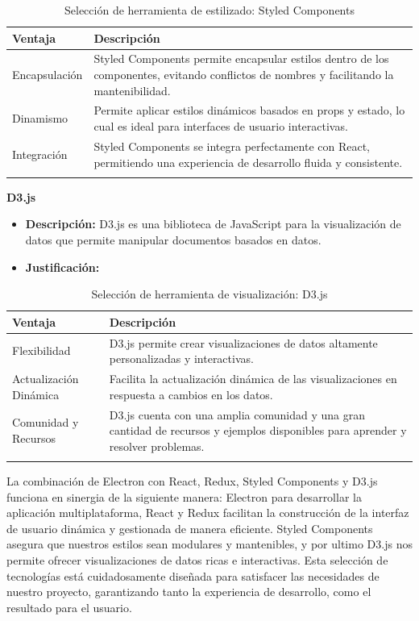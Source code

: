 \begin{longtable}{|p{3cm}|p{10cm}|}
\hline
\textbf{Ventaja} & \textbf{Descripción} \\ \hline
Encapsulación & Styled Components permite encapsular estilos dentro de los componentes, evitando conflictos de nombres y facilitando la mantenibilidad. \\ \hline
Dinamismo & Permite aplicar estilos dinámicos basados en props y estado, lo cual es ideal para interfaces de usuario interactivas. \\ \hline
Integración & Styled Components se integra perfectamente con React, permitiendo una experiencia de desarrollo fluida y consistente. \\ \hline
\caption{Selección de herramienta de estilizado: Styled Components}
\end{longtable}

\textbf{D3.js}
\begin{itemize}[label={}, leftmargin=0pt]
    \item \textbf{Descripción:} D3.js es una biblioteca de JavaScript para la visualización de datos que permite manipular documentos basados en datos.
    \item \textbf{Justificación:}
\end{itemize}

\begin{longtable}{|p{3cm}|p{10cm}|}
\hline
\textbf{Ventaja} & \textbf{Descripción} \\ \hline
Flexibilidad & D3.js permite crear visualizaciones de datos altamente personalizadas y interactivas. \\ \hline
Actualización Dinámica & Facilita la actualización dinámica de las visualizaciones en respuesta a cambios en los datos. \\ \hline
Comunidad y Recursos & D3.js cuenta con una amplia comunidad y una gran cantidad de recursos y ejemplos disponibles para aprender y resolver problemas. \\ \hline
\caption{Selección de herramienta de visualización: D3.js}
\end{longtable}

La combinación de Electron con React, Redux, Styled Components y D3.js funciona en sinergia de la siguiente manera: Electron para desarrollar la aplicación multiplataforma, React y Redux facilitan la construcción de la interfaz de usuario dinámica y gestionada de manera eficiente. Styled Components asegura que nuestros estilos sean modulares y mantenibles, y por ultimo D3.js nos permite ofrecer visualizaciones de datos ricas e interactivas.
Esta selección de tecnologías está cuidadosamente diseñada para satisfacer las necesidades de nuestro proyecto, garantizando tanto la experiencia de desarrollo, como el resultado para el usuario. \\
